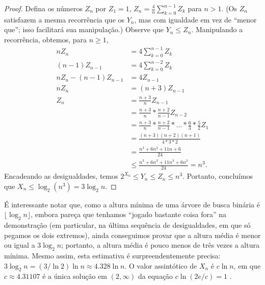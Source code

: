 \begin{proof}
    Defina os números $Z_n$ por $Z_1 = 1$,
    $Z_n = \frac 4 n \sum_{k = 0}^{n-1} Z_k$ para $n > 1$.
    (Os $Z_n$ satisfazem a mesma recorrência que os $Y_n$,
    mas com igualdade em vez de ``menor que'';
    isso facilitará sua manipulação.)
    Observe que $Y_n \leq Z_n$.
    Manipulando a recorrência, obtemos, para $n \geq 1$,
    \begin{align*}
        n Z_n &= 4 \sum_{k = 0}^{n-1} Z_k \\
        (n-1) Z_{n-1} &= 4 \sum_{k = 0}^{n-2} Z_k \\
        n Z_n - (n-1) Z_{n-1} &= 4 Z_{n-1} \\
        n Z_n &= (n+3) Z_{n-1} \\
        Z_n &= \frac{n+3}{n} Z_{n-1} \\
            &= \frac{n+3}{n} * \frac{n+2}{n-1} Z_{n-2} \\
            &= \frac{n+3}{n} * \frac{n+2}{n-1} * \dots * \frac 6 3 * \frac 5 2 Z_1 \\
            &= \frac{(n+3)(n+2)(n+1)}{4*3*2} \\
            &= \frac{n^3 + 6n^2 + 11n + 6}{24} \\
            &\leq \frac {n^3 + 6n^3 + 11n^3 + 6n^3}{24} = n^3.
    \end{align*}
    Encadeando as desigualdades, temos $2^{X_n} \leq Y_n \leq Z_n \leq n^3$.
    Portanto, concluímos que $X_n \leq \log_2(n^3) = 3 \log_2 n$.
\end{proof}

É interessante notar que,
como a altura mínima de uma árvore de busca binária é $\lfloor \log_2 n \rfloor$,
embora pareça que tenhamos ``jogado bastante coisa fora'' na demonstração
(em particular, na última sequência de desigualdades, em que só pegamos os dois extremos),
ainda conseguimos provar que a altura média é menor ou igual a $3 \log_2 n$;
portanto,
a altura média é pouco menos de três vezes a altura mínima.
Mesmo assim,
esta estimativa é surpreendentemente precisa:
$3 \log_2 n = (3/\ln 2) \ln n \approx 4.328 \ln n$.
O valor assintótico de $X_n$ é $c \ln n$,
em que $c \approx 4.31107$ é a única solução em $(2, \infty)$ da equação $c \ln(2e/c) = 1$
\cite[p.~308]{SedgewickFlajolet2013}.
